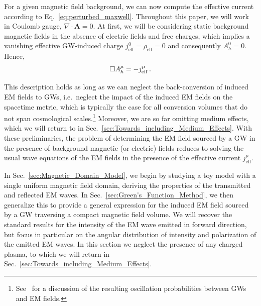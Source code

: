 \documentclass[a4paper,11pt]{article}
\begin{document}
%
For a given magnetic field background, we can now compute the effective current according to Eq.~\eqref{eq:perturbed_maxwell}.
%
Throughout this paper, we will  work in Coulomb gauge, $ \nabla \cdot {\bm A} = 0 $. At first, we will be considering static background magnetic fields in the absence of electric fields and free charges, which implies a vanishing effective GW-induced charge $j_\text{eff}^0 = \rho_\text{eff} = 0$ and consequently $A_h^{0} = 0$.
%
Hence,
\begin{align}
 \Box A_{h}^{\mu} = - j_{\rm eff}^{\mu} \,.
 \label{eq:Ajeff}
\end{align}



%
This description holds as long as we can neglect the back-conversion of induced EM fields to GWs, i.e.\ neglect the impact of the induced EM fields on the spacetime metric, which is typically the case for all conversion volumes that do not span cosmological scales.\footnote{See~\cite{Raffelt:1987im} for a discussion of the resulting oscillation probabilities between GWs and EM fields.}
%
Moreover, we are so far omitting medium effects, which we will return to in Sec.~\ref{sec:Towards_including_Medium_Effects}.
%
With these preliminaries, the problem of determining the EM field sourced by a GW in the presence of background magnetic (or electric) fields reduces to solving the usual wave equations of the EM fields in the presence of the effective current $j^\mu_\text{eff}$.
%


In Sec.~\ref{sec:Magnetic_Domain_Model}, we begin by studying a toy model with a single uniform magnetic field domain, deriving the properties of the transmitted and reflected EM waves.
%
In Sec.~\ref{sec:Green's_Function_Method}, we then generalize this to provide a general expression for the induced EM field sourced by a GW traversing a compact magnetic field volume.
%
We will recover the standard results for the intensity of the EM wave emitted in forward direction, but focus in particular on the angular distribution of intensity and polarization of the emitted EM waves.
%
In this section we neglect the presence of any charged plasma, to which we will return in Sec.~\ref{sec:Towards_including_Medium_Effects}.
\end{document}
